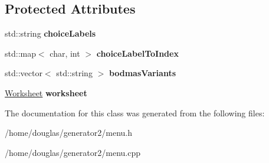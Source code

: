 \subsection*{Protected Attributes}
\begin{DoxyCompactItemize}
\item 
std\+::string {\bfseries choice\+Labels}\hypertarget{classMenu_a672f60ceacb5575bae40420833c6ec5c}{}\label{classMenu_a672f60ceacb5575bae40420833c6ec5c}

\item 
std\+::map$<$ char, int $>$ {\bfseries choice\+Label\+To\+Index}\hypertarget{classMenu_af532dd3049db66e1685446259f23a9d8}{}\label{classMenu_af532dd3049db66e1685446259f23a9d8}

\item 
std\+::vector$<$ std\+::string $>$ {\bfseries bodmas\+Variants}\hypertarget{classMenu_ac57df072a5c984cc013f96e6dc7e37f7}{}\label{classMenu_ac57df072a5c984cc013f96e6dc7e37f7}

\item 
\hyperlink{classWorksheet}{Worksheet} {\bfseries worksheet}\hypertarget{classMenu_a34d304dccfe737f272d9f1c7be00bda0}{}\label{classMenu_a34d304dccfe737f272d9f1c7be00bda0}

\end{DoxyCompactItemize}


The documentation for this class was generated from the following files\+:\begin{DoxyCompactItemize}
\item 
/home/douglas/generator2/menu.\+h\item 
/home/douglas/generator2/menu.\+cpp\end{DoxyCompactItemize}
